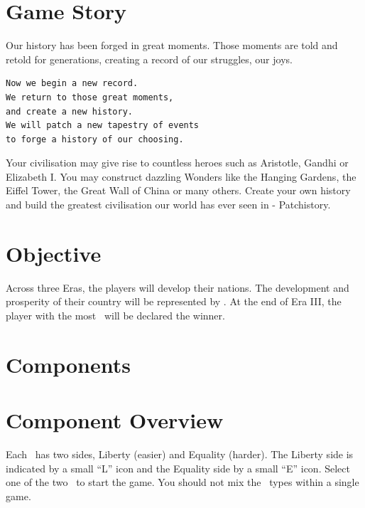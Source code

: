 \documentclass[10pt,twocolumn]{article}
\newif\iforiginal
\begin{document}
\section{Game Story}
\iforiginal
The mankind has evolved consistently over the great moments, and that great moments have been recorded through history.
\begin{verbatim}We start a new record.
We go back to those great moments,
and choose the future of our own.
We patch the history with new pieces
of events of our own choices.\end{verbatim}
Your country may have great men like Aristotle or Gandhi, or the grand monuments such as Pyramid and Eiffel Tower. Record your own history and build a kingdom greater than any other's, with Patchistory.
\else
Our history has been forged in great moments. Those moments are told and retold for generations, creating a record of our struggles, our joys.
\begin{verbatim}Now we begin a new record.
We return to those great moments,
and create a new history.
We will patch a new tapestry of events
to forge a history of our choosing.\end{verbatim}
Your civilisation may give rise to countless heroes such as Aristotle, Gandhi or Elizabeth I. You may construct dazzling Wonders like the Hanging Gardens, the Eiffel Tower, the Great Wall of China or many others.
Create your own history and build the greatest civilisation our world has ever seen in - Patchistory.
\fi
\section{Objective}
Across three Eras, the players will develop their nations. The development and prosperity of their country will be represented by \victorypoints. At the end of Era III, the player with the most \victorypoints\ will be declared the winner.
\section{Components}
\section{Component Overview}
\compHead{\baselands}
Each \baseland\ has two sides, Liberty (easier) and Equality (harder). The Liberty side is indicated by a small ``L'' icon and the Equality side by a small ``E'' icon. Select one of the two \baselands\ to start the game. You should not mix the \baseland\ types within a single game.
\end{document}
